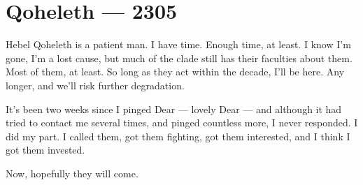 \hypertarget{qoheleth-2305}{%
\chapter*{Qoheleth — 2305}\label{qoheleth-2305}}

Hebel Qoheleth is a patient man. I have time. Enough time, at least. I know I'm gone, I'm a lost cause, but much of the clade still has their faculties about them. Most of them, at least. So long as they act within the decade, I'll be here. Any longer, and we'll risk further degradation.

It's been two weeks since I pinged Dear — lovely Dear — and although it had tried to contact me several times, and pinged countless more, I never responded. I did my part. I called them, got them fighting, got them interested, and I think I got them invested.

Now, hopefully they will come.
